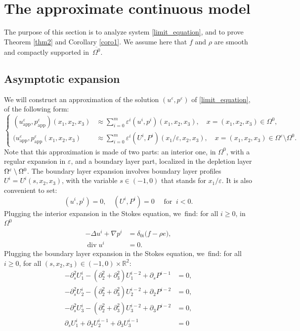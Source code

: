 \documentclass[10pt]{amsart}
\newcommand{\app}{\mathrm{app}}
\renewcommand{\div}{\operatorname{div}}
\theoremstyle{plain}
\theoremstyle{definition}
\let\pa\partial
\let\na\nabla
\let\eps\varepsilon
\newcommand{\R}{\mathbb{R}}
\begin{document}
\section{The approximate continuous model} \label{sec_wall_law}The purpose of this section is to analyze system \eqref{limit_equation}, and to prove Theorem \ref{thm2} and Corollary \ref{coro1}. We assume here that $f$ and $\rho$ are smooth and compactly supported in~$\overline{\Omega^0}$.

\subsection{Asymptotic expansion}
We will construct an approximation of the solution $(u^\eps,p^\eps)$ of \eqref{limit_equation}, of the following form:
\begin{equation*}
\left\{
\begin{aligned}
(u^\eps_{\app},p^\eps_{\app})(x_1,x_2,x_3) & \approx \sum_{i=0}^m \eps^i (u^i, p^i)(x_1,x_2,x_3), \quad x = (x_1,x_2,x_3) \in \Omega^0, \\
(u^\eps_{\app}, p^\eps_{\app}(x_1,x_2,x_3) & \approx \sum_{i=0}^m \eps^i (U^i, P^i)(x_1/\eps,x_2,x_3), \quad x = (x_1,x_2,x_3) \in \Omega^\eps\setminus\Omega^0.
\end{aligned}
\right.
\end{equation*}
Note that this approximation is made of two parts: an interior one, in $\Omega^0$, with a regular expansion in $\eps$, and a boundary layer part, localized in the depletion layer $\Omega^\eps \setminus\nobreak \Omega^0$. The boundary layer expansion involves boundary layer profiles $U^i = U^i(s,x_2,x_3)$, with the variable $s \in (-1,0)$ that stands for
$x_1/\eps$. It is also convenient to set:
\[
(u^i, p^i)= 0, \quad (U^i, P^i) = 0 \quad \text{ for } \: i < 0.
\]
Plugging the interior expansion in the Stokes equation, we~find: for all $i \ge 0$, in $\Omega^0$
\begin{equation} \label{stokesint}
\begin{aligned}
-\Delta u^i + \na p^i & = \delta_{0i} \big(f - \rho e \big), \\
\div u^i & = 0.
\end{aligned}
\end{equation}
Plugging the boundary layer expansion in the Stokes equation, we~find: for all $i \ge 0$, for all $(s,x_2,x_3) \in (-1,0) \times \R^2$:
\begin{align}
-\pa^2_s U^i_1 - (\pa^2_2 + \pa^2_3) U^{i-2}_1 + \pa_s P^{i-1} & = 0, \label{stokesx} \\
-\pa^2_s U^i_2 - (\pa^2_2 + \pa^2_3) U^{i-2}_2 + \pa_2 P^{i-2} & = 0, \label{stokesy}\\
-\pa^2_s U^i_3 - (\pa^2_2 + \pa^2_3) U^{i-2}_3 + \pa_3 P^{i-2} & = 0, \label{stokesz} \\
\pa_s U^i_1 + \pa_2 U^{i-1}_2 + \pa_3 U^{i-1}_3 & = 0 \label{stokesdiv}
\end{align}
\end{document}
